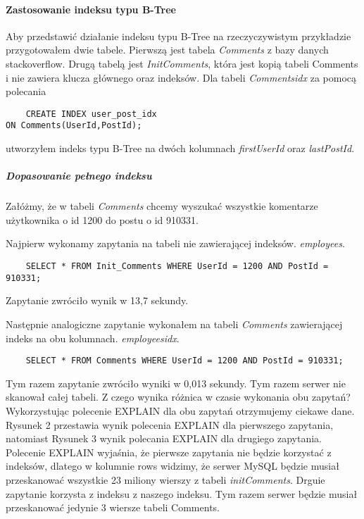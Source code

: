\paragraph{Zastosowanie indeksu typu B-Tree}\mbox{}

Aby przedstawić działanie indeksu typu B-Tree na rzeczyczywistym przykładzie przygotowałem dwie tabele. Pierwszą jest tabela \textit{Comments} z bazy danych stackoverflow. Drugą tabelą jest \textit{Init\textunderscore Comments}, która jest kopią tabeli Comments i nie zawiera klucza głównego oraz indeksów.
Dla tabeli \textit{Comments\textunderscore idx} za pomocą polecania \begin{verbatim}
    CREATE INDEX user_post_idx 
ON Comments(UserId,PostId);
\end{verbatim}
utworzyłem indeks typu B-Tree na dwóch kolumnach \textit{first\textunderscore UserId} oraz \textit{last\textunderscore PostId}.

\subparagraph{Dopasowanie pełnego indeksu}\mbox{}

Załóżmy, że w tabeli \textit{Comments} chcemy wyszukać wszystkie komentarze użytkownika o id 1200 do postu o id 910331.

Najpierw wykonamy zapytania na tabeli nie zawierającej indeksów.
 \textit{employees}. 
\begin{verbatim}
    SELECT * FROM Init_Comments WHERE UserId = 1200 AND PostId = 910331;
\end{verbatim}
Zapytanie zwróciło wynik w 13,7 sekundy.

Następnie analogiczne zapytanie wykonałem na tabeli \textit{Comments} zawierającej indeks na obu kolumnach.
\textit{employees\textunderscore idx}. 
\begin{verbatim}
    SELECT * FROM Comments WHERE UserId = 1200 AND PostId = 910331;
\end{verbatim}
Tym razem zapytanie zwróciło wyniki w 0,013 sekundy. Tym razem serwer nie skanował całej tabeli. Z czego wynika różnica w czasie wykonania obu zapytań? Wykorzystując polecenie EXPLAIN dla obu zapytań otrzymujemy ciekawe dane. Rysunek 2 przestawia wynik polecenia EXPLAIN dla pierwszego zapytania, natomiast Rysunek 3 wynik polecania EXPLAIN dla drugiego zapytania. Polecenie EXPLAIN wyjaśnia, że pierwsze zapytania nie będzie korzystać z indeksów, dlatego w kolumnie rows widzimy, że serwer MySQL będzie musiał przeskanować wszystkie 23 miliony wierszy z tabeli \textit{init\textunderscore Comments}. Drguie zapytanie korzysta z indeksu z naszego indeksu. Tym razem serwer będzie musiał przeskanować jedynie 3 wiersze tabeli Comments. 

